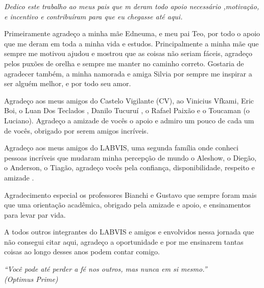 \documentclass[
	12pt,				%
	openright,			%
	oneside,			%
	a4paper,			%
	english,			%
	brazil				%
	]{abntex2}
\begin{document}
\begin{dedicatoria}
   \vspace*{\fill}
   \centering
   \noindent
   \textit{ Dedico este trabalho ao meus pais que m deram todo apoio necessário ,motivação, e incentivo e contribuíram para que eu chegasse até aqui.} \vspace*{\fill}
\end{dedicatoria}

\begin{agradecimentos}
 Primeiramente agradeço a minha mãe Edneuma, e meu pai Teo, por todo o apoio que me deram em toda a minha vida e estudos. Principalmente a minha mãe que sempre me motivou ajudou e mostrou que as coisas não seriam fáceis, agradeço pelos puxões de orelha e sempre me manter no caminho correto. Gostaria de agradecer também, a minha namorada e amiga Silvia por sempre me inspirar a ser alguém melhor, e por todo seu amor.  
 
Agradeço aos meus amigos do Castelo Vigilante (CV), ao Vinicius Vfkami,  Eric  Boi, o Luan Dos Teclados , Danilo Tucuruí , o Rafael Paixão e o Toucaman (o Luciano).  Agradeço a amizade de vocês o apoio e admiro um pouco de cada um de vocês, obrigado por serem amigos incríveis.

Agradeço aos meus amigos do LABVIS, uma segunda família onde conheci pessoas incríveis que mudaram minha percepção de mundo o Aleshow, o Diegão, o Anderson, o Tiagão, agradeço vocês pela confiança, disponibilidade, respeito e amizade .

Agradecimento especial os professores Bianchi e Gustavo que sempre foram mais que uma orientação acadêmica, obrigado pela amizade e apoio, e ensinamentos para levar par vida.

A todos outros integrantes do LABVIS e amigos e envolvidos nessa jornada que não consegui citar aqui, agradeço a oportunidade e por me ensinarem tantas coisas ao longo desses anos podem contar comigo.

\end{agradecimentos}

\begin{epigrafe}
    \vspace*{\fill}
	\begin{flushright}
		\textit{``Você pode até perder a fé nos outros, mas nunca em si mesmo.''\\
		(Optimus Prime)}
	\end{flushright}
\end{epigrafe}
\end{document}
